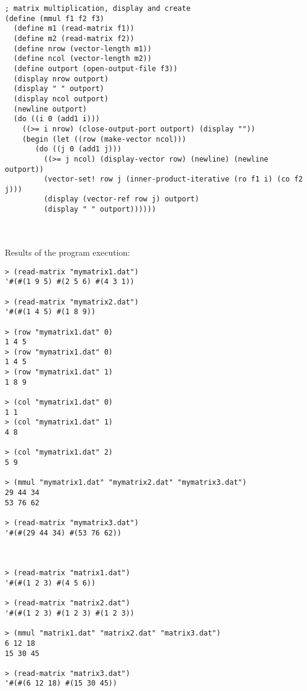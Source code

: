 \documentclass{article}
\begin{document}
\begin{verbatim}
; matrix multiplication, display and create
(define (mmul f1 f2 f3)
  (define m1 (read-matrix f1))
  (define m2 (read-matrix f2))
  (define nrow (vector-length m1))
  (define ncol (vector-length m2))
  (define outport (open-output-file f3))
  (display nrow outport)
  (display " " outport)
  (display ncol outport)
  (newline outport)
  (do ((i 0 (add1 i)))
    ((>= i nrow) (close-output-port outport) (display ""))
    (begin (let ((row (make-vector ncol)))
       (do ((j 0 (add1 j)))
         ((>= j ncol) (display-vector row) (newline) (newline outport))
         (vector-set! row j (inner-product-iterative (ro f1 i) (co f2 j)))
         (display (vector-ref row j) outport)
         (display " " outport))))))
\end{verbatim}
\paragraph{}\

	Results of the program execution:
\begin{verbatim}
> (read-matrix "mymatrix1.dat")
'#(#(1 9 5) #(2 5 6) #(4 3 1))

> (read-matrix "mymatrix2.dat")
'#(#(1 4 5) #(1 8 9))

> (row "mymatrix1.dat" 0)
1 4 5 
> (row "mymatrix1.dat" 0)
1 4 5 
> (row "mymatrix1.dat" 1)
1 8 9 

> (col "mymatrix1.dat" 0)
1 1 
> (col "mymatrix1.dat" 1)
4 8 

> (col "mymatrix1.dat" 2)
5 9 

> (mmul "mymatrix1.dat" "mymatrix2.dat" "mymatrix3.dat")
29 44 34 
53 76 62 

> (read-matrix "mymatrix3.dat")
'#(#(29 44 34) #(53 76 62))



> (read-matrix "matrix1.dat")
'#(#(1 2 3) #(4 5 6))

> (read-matrix "matrix2.dat")
'#(#(1 2 3) #(1 2 3) #(1 2 3))

> (mmul "matrix1.dat" "matrix2.dat" "matrix3.dat")
6 12 18 
15 30 45 

> (read-matrix "matrix3.dat")
'#(#(6 12 18) #(15 30 45))


\end{verbatim}
\end{document}
